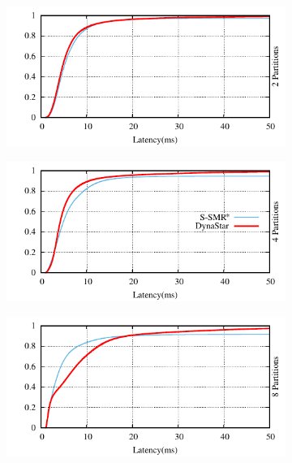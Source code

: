 \begin{figure}[ht!]
  \centering
  \begin{subfigure}{0.48\columnwidth}
    \centering
    \includegraphics[width=\textwidth]{./figures/experiments/dynastar/chirper-latency-cdf-2p.pdf}
  \end{subfigure}
  \begin{subfigure}{0.48\columnwidth}
    \centering
    \includegraphics[width=\textwidth]{./figures/experiments/dynastar/chirper-latency-cdf-4p.pdf}
  \end{subfigure}
  \begin{subfigure}{0.48\columnwidth}
    \centering
    \includegraphics[width=\textwidth]{./figures/experiments/dynastar/chirper-latency-cdf-8p.pdf}

\end{subfigure}
\end{figure}

